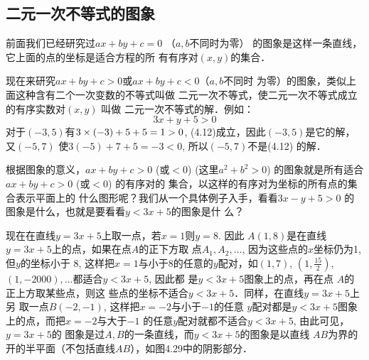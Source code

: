 \subsection{二元一次不等式的图象}
前面我们已经研究过$ax+by+c=0$ （$a,b$不同时为零）
的图象是这样一条直线，它上面的点的坐标是适合方程的所
有有序对$(x,y)$的集合．

现在来研究$ax+by+c>0$或$ax+by+c<0$（$a,b$不同时
为零）的图象，类似上面这种含有二个一次变数的不等式叫做
二元一次不等式，使二元一次不等式成立的有序实数对$(x,y)$
叫做 二元一次不等式的解．例如：
\begin{equation}
 3x+y+5>0   
\end{equation}
对于$(-3,5)$有$3\times(-3)+5+5=
1>0$, (4.12)成立，因此$(-3,5)$是它的解，又$(-5,7)$
使$3(-5)+7+5=-3<0$, 所以$(-5,7)$不是(4.12)
的解．

根据图象的意义，$ax+by+c>0$ (或$<0$) (这里$a^2+b^2>
0$) 的图象就是所有适合$ax+by+c>0$ (或$<0$) 的有序对的
集合，以这样的有序对为坐标的所有点的集合表示平面上的
什么图形呢？我们从一个具体例子入手，看看$3x-y+5>0$
的图象是什么，也就是要看看$y<3x+5$的图象是什
么？

现在在直线$y=3x+5$上取一点，若$x=1$则$y=8$. 因此
$A(1,8)$是在直线$y=3x+5$上的点，如果在点$A$的正下方取
点$A_1,A_2,\ldots$, 因为这些点的$x$坐标仍为1, 但$y$的坐标小于
8, 这样把$x=1$与小于8的任意的$y$配对，如$(1,7)$, 
$\left(1,\frac{15}{2}\right)$, $(1,-2000),\ldots$都适合$y<3x+5$, 因此都
是$y<3x+5$图象上的点，再在点
$A$的正上方取某些点，则这
些点的坐标不适合$y<3x+5$．同样，在直线$y=3x+5$上另
取一点$B(-2,-1)$, 这样把$x=-2$与小于$-1$的任意
$y$配对都是$y<3x+5$图象上的点，而把$x=-2$与大于$-1$
的任意$y$配对就都不适合$y<3x+5$, 由此可见，$y=3x+5$的
图象是过$A,B$的一条直线，而$y<3x+5$的图象是以直线
$AB$为界的开的半平面（不包括直线$AB$），如图4.29中的阴影部分．

\begin{figure}[htp]
    \centering
{}
    \caption{}
\end{figure}

